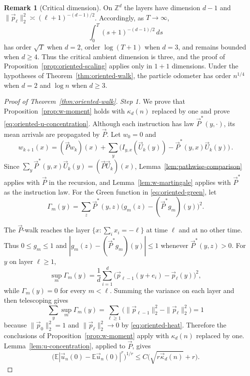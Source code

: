 \documentclass[11pt]{amsart}
\theoremstyle{plain}
\theoremstyle{definition}
\newtheorem{remark}[theorem]{Remark}
\newcommand{\Z}{\mathbb{Z}}
\newcommand{\E}{\mathbb{E}}
\begin{document}
\begin{remark}[Critical dimension]\label{rem:critical-dimension}
	On $\Z^d$ the layers have dimension $d-1$ and
	$\|\vec p_\ell\|_2^2\asymp(\ell+1)^{-(d-1)/2}$. Accordingly, as
	$T\to\infty$,
	\[
		\int_0^T(s+1)^{-(d-1)/2}\,ds
	\]
	has order $\sqrt T$ when $d=2$, order $\log(T+1)$ when $d=3$, and remains
	bounded when $d\geq4$. Thus the critical ambient dimension is three,
	and the proof of Proposition~\ref{prop:oriented-scaling} applies only in
	$1+1$ dimensions. Under
	the hypotheses of Theorem~\ref{thm:oriented-walk}, the particle odometer has
	order $n^{1/4}$ when $d=2$ and $\log n$ when $d\geq3$.
\end{remark}

\begin{proof}[Proof of Theorem~\ref{thm:oriented-walk}]
	\smallskip
	\noindent\emph{Step 1.} We prove that
	Proposition~\ref{prop:w-moment} holds with $\kappa_d(n)$ replaced by one and
	prove \eqref{eq:oriented-u-concentration}.
	Although each instruction has law $\vec P^*(y,\cdot)$, its mean arrivals are
	propagated by $\vec P$. Let $w_0=0$ and
	\[
		w_{k+1}(x)=(\vec Pw_k)(x)
		+\sum_y\bigl(I_{y,x}(\vec U_k(y))-\vec P^*(y,x)\vec U_k(y)\bigr)\,.
	\]
	Since $\sum_y\vec P^*(y,x)\vec U_k(y)=(\vec P\vec U_k)(x)$,
	Lemma~\ref{lem:pathwise-comparison} applies with $\vec P$ in the recursion,
	and Lemma~\ref{lem:w-martingale} applies with $\vec P^*$ as the instruction
	law. For the Green function in \eqref{eq:oriented-green}, let
	\[
		\Gamma_m(y)=\sum_z\vec P^*(y,z)\bigl(g_m(z)-(\vec P^*g_m)(y)\bigr)^2.
	\]

	The $\vec P$-walk reaches the layer $\{x:\sum_i x_i=-\ell\}$ at time $\ell$ and at
	no other time. Thus $0\leq g_m\leq1$ and
	$|g_m(z)-(\vec P^*g_m)(y)|\leq1$ whenever $\vec P^*(y,z)>0$. For $y$ on layer
	$\ell\geq1$,
	\[
		\sup_m\Gamma_m(y)=\frac1{d}\sum_{i=1}^{d}
		\bigl(\vec p_{\ell-1}(y+e_i)-\vec p_\ell(y)\bigr)^2,
	\]
	while $\Gamma_m(y)=0$ for every $m<\ell$. Summing the variance on each layer
	and then telescoping gives
	\[
		\sum_y\sup_m\Gamma_m(y)
		=\sum_{\ell\geq1}
		\bigl(\|\vec p_{\ell-1}\|_2^2-\|\vec p_\ell\|_2^2\bigr)
		=1
	\]
	because $\|\vec p_0\|_2^2=1$ and
	$\|\vec p_\ell\|_2^2\to0$ by \eqref{eq:oriented-heat}. Therefore the conclusions of
	Proposition~\ref{prop:w-moment} apply with $\kappa_d(n)$ replaced by one.
	Lemma~\ref{lem:u-concentration}, applied to $\vec P$, gives
	\begin{equation}\label{eq:oriented-u-concentration}
		\bigl(\E|\vec u_n(0)-\E \vec u_n(0)|^r\bigr)^{1/r}
		\leq C\bigl(\sqrt{r\vec\kappa_d(n)}+r\bigr).
	\end{equation}


\end{proof}
\end{document}
